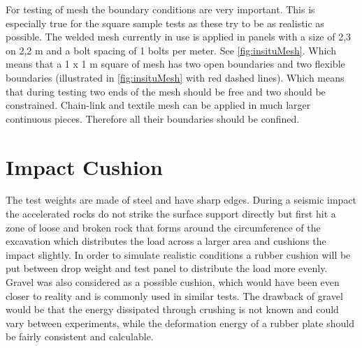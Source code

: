 For testing of mesh the boundary conditions are very important. \autocite[5]{villa09} This is especially true for the square sample tests as these try to be as realistic as possible.
The welded mesh currently in use is applied in panels with a size of 2,3 on 2,2 m and a bolt spacing of 1 bolts per meter. See \autoref{fig:insituMesh}. Which means that a 1 x 1 m square of mesh has two open boundaries and two flexible boundaries (illustrated in \autoref{fig:insituMesh} with red dashed lines). Which means that during testing two ends of the mesh should be free and two should be constrained. 
Chain-link and textile mesh can be applied in much larger continuous pieces. Therefore all their boundaries should be confined.


\section{Impact Cushion}

The test weights are made of steel and have sharp edges. During a  seismic impact the accelerated rocks do not strike the surface support directly but first hit a zone of loose and broken rock that forms around the circumference of the excavation which distributes the load across a larger area and cushions the impact slightly. In order to simulate realistic conditions a rubber cushion will be put between drop weight and test panel to distribute the load more evenly. Gravel was also considered as a possible cushion, which would have been even closer to reality and is commonly used in similar tests. The drawback of gravel would be that the energy dissipated through crushing is not known and could vary between experiments, while the deformation energy of a rubber plate should be fairly consistent and calculable.

